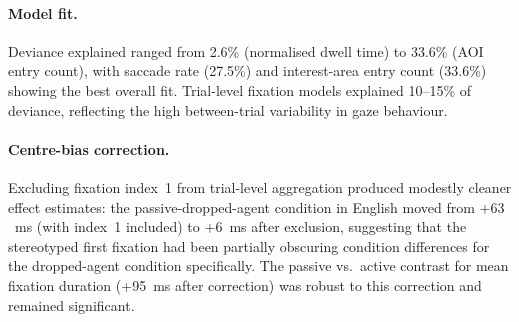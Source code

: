 \documentclass[12pt, a4paper]{article}
\begin{document}
\paragraph{Model fit.}
Deviance explained ranged from 2.6\% (normalised dwell time) to 33.6\%
(AOI entry count), with saccade rate (27.5\%) and interest-area entry
count (33.6\%) showing the best overall fit.
Trial-level fixation models explained 10--15\% of deviance, reflecting
the high between-trial variability in gaze behaviour.

\paragraph{Centre-bias correction.}
Excluding fixation index~1 from trial-level aggregation produced
modestly cleaner effect estimates: the passive-dropped-agent condition
in English moved from $+63$~ms (with index~1 included) to $+6$~ms
after exclusion, suggesting that the stereotyped first fixation had
been partially obscuring condition differences for the dropped-agent condition
specifically.
The passive vs.\ active contrast for mean fixation duration
(+95~ms after correction) was robust to this correction and remained
significant.

\bigskip



\end{document}
